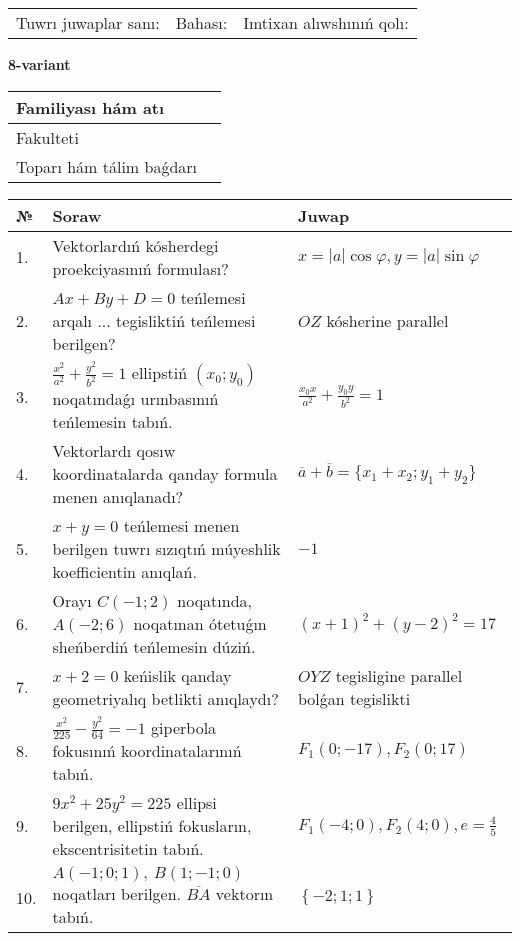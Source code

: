 \documentclass{article}
\begin{document}
\vspace{1cm}

\begin{tabular}{lll}
Tuwrı juwaplar sanı: \underline{\hspace{1.5cm}} & 
Bahası: \underline{\hspace{1.5cm}} & 
Imtixan alıwshınıń qolı: \underline{\hspace{2cm}} \\
\end{tabular}

\egroup

\newpage


\textbf{8-variant}\\

\bgroup
\def\arraystretch{1.6} %

\begin{tabular}{|m{5.7cm}|m{9.5cm}|}
\hline
Familiyası hám atı & \\
\hline
Fakulteti  & \\
\hline
Toparı hám tálim baǵdarı  & \\
\hline
\end{tabular}

\vspace{1cm}

\begin{tabular}{|m{0.7cm}|m{10cm}|m{4cm}|}
\hline
№ & Soraw & Juwap \\
\hline
1. & Vektorlardıń kósherdegi proekciyasınıń formulası? & $x=|a|\cos\varphi, y=|a|\sin\varphi$ \\
\hline
2. & $Ax+By+D=0$ teńlemesi arqalı ... tegisliktiń teńlemesi berilgen? & $OZ$ kósherine parallel \\
\hline
3. & $\frac{x^2}{a^2}+\frac{y^2}{b^2}=1$ ellipstiń $(x_0;y_0)$ noqatındaǵı urınbasınıń teńlemesin tabıń. & $\frac{x_0x}{a^2}+\frac{y_0y}{b^2}=1$ \\
\hline
4. & Vektorlardı qosıw koordinatalarda qanday formula menen anıqlanadı? & $\overline{a}+\overline{b}=\{x_1+x_2;y_1+y_2\}$ \\
\hline
5. & $x+y=0$ teńlemesi menen berilgen tuwrı sızıqtıń múyeshlik koefficientin anıqlań. & $- 1$ \\
\hline
6. & Orayı $C (-1;2)$ noqatında, $A (-2;6 )$ noqatınan ótetuǵın sheńberdiń teńlemesin dúziń. & $(x+1)^{2}+(y-2)^{2}=17$ \\
\hline
7. & $x+2=0$ keńislik qanday geometriyalıq betlikti anıqlaydı? &  $OYZ$ tegisligine parallel bolǵan tegislikti \\
\hline
8. & $\frac{x^{2}}{225}-\frac{y^{2}}{64}=-1$ giperbola fokusınıń koordinatalarınıń tabıń. & $F_{1}(0;-17), F_{2}(0;17)$ \\
\hline
9. & $9x^{2}+25y^{2}=225$ ellipsi berilgen, ellipstiń fokusların, ekscentrisitetin tabıń. & $F_1\left(-4;0 \right) , F_2\left( 4;0 \right) , e = \frac{4}{5}$ \\
\hline
10. & $A (-1;0;1),\ B (1;-1;0)$ noqatları berilgen. $\overline{BA}$ vektorın tabıń. & $\left\{ - 2;1;1 \right\}$ \\
\hline
\end{tabular}
\end{document}
